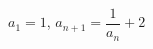 \hspace*{2mm}\begin{minipage}[t]{\dimexpr\linewidth-2mm\relax}\vspace{0pt}
$a_1=1$, $a_{n+1}=\dfrac{1}{a_n}+2$\end{minipage}
